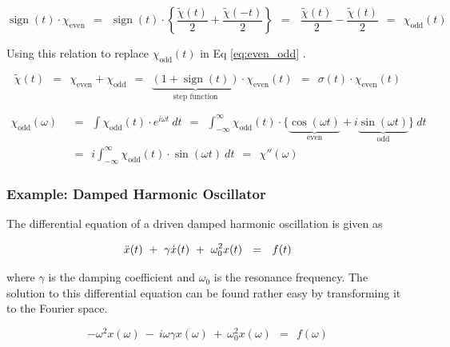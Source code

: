 \documentclass[10pt]{report}
\numberwithin{equation}{chapter}
\newcommand{\refEq}[1]{
  Eq  \ref{#1}
}
\DeclareMathOperator{\sign}{sign}
\begin{document}
\begin{equation}
  \sign(t) \cdot \chi_\text{even} ~~ = ~~ \sign(t) \cdot \left\{ \frac{\tilde{\chi}(t)}{2} + \frac{\tilde{\chi}(-t)}{2} \right\} ~~ = ~~~\frac{\tilde{\chi}(t)}{2} - \frac{\tilde{\chi}(t)}{2} ~~ = ~~ \chi_\text{odd}(t)
\end{equation}


Using this relation to replace $\chi_\text{odd}(t)$ in \refEq{eq:even_odd}.


\begin{equation}
\tilde{\chi}(t) ~~ = ~~ \chi_\text{even} + \chi_\text{odd} ~~ = ~~ \underbrace{(1 + \sign(t))}_\text{step function} \cdot \chi_\text{even}(t) ~~ = ~~ \sigma(t) \cdot \chi_\text{even}(t)
\end{equation}


\begin{align}
  \chi_\text{odd}(\omega) ~~& =~~ \int \chi_\text{odd}(t) \cdot e^{i\omega t}\ dt
  ~~=~~ \int_{-\infty}^\infty \chi_\text{odd}(t) \cdot
  \{ \underbrace{\cos(\omega t)}_\text{even} + i\underbrace{\sin(\omega t)}_\text{odd} \}\ dt \nonumber \\
  ~~& =~~ i \int_{-\infty}^{\infty} \chi_\text{odd}(t) \cdot \sin(\omega t)\ dt ~~=~~ \chi''(\omega)
\end{align}


\subsubsection{Example: Damped Harmonic Oscillator}

The differential equation of a driven damped harmonic oscillation is given as

\begin{equation} \label{eq:damped_osc_DE}
  \Ddot{x}(t) ~+~ \gamma \dot{x}(t) ~+~ \omega_0^2 x(t) ~~=~~ f(t)
\end{equation}

where $\gamma$ is the damping coefficient and $\omega_0$ is the resonance frequency.
The solution to this differential equation can be found rather easy by transforming it to the Fourier space.

\begin{equation}
  -\omega^2 x(\omega) ~-~ i \omega \gamma x(\omega) ~+~ \omega_0^2 x(\omega) ~~=~~ f(\omega)
\end{equation}

\end{document}
